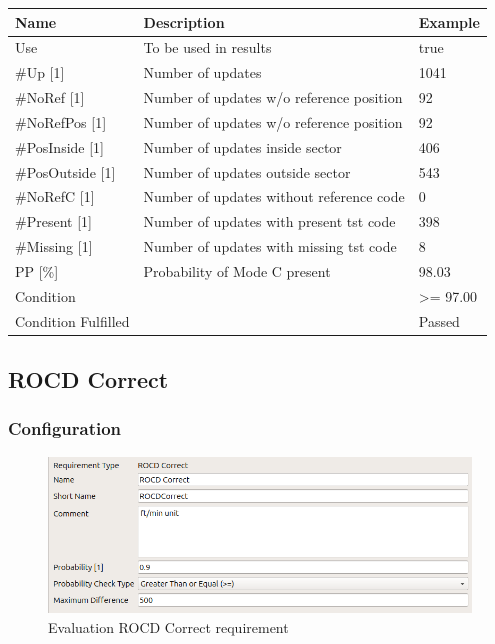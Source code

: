\begin{center}
 \begin{table}[H]
  \begin{tabularx}{\textwidth}{ | l | X |  l | }
    \hline
    \textbf{Name} & \textbf{Description} & \textbf{Example} \\ \hline
    Use & To be used in results & true \\ \hline
    \#Up [1] & Number of updates & 1041 \\ \hline
    \#NoRef [1] & Number of updates w/o reference position & 92 \\ \hline
    \#NoRefPos [1] & Number of updates w/o reference position  & 92 \\ \hline
    \#PosInside [1] & Number of updates inside sector & 406 \\ \hline
    \#PosOutside [1] & Number of updates outside sector & 543 \\ \hline
    \#NoRefC [1] & Number of updates without reference code & 0 \\ \hline
    \#Present [1] & Number of updates with present tst code & 398 \\ \hline
    \#Missing [1] & Number of updates with missing tst code & 8 \\ \hline
    PP [\%] & Probability of Mode C present & 98.03 \\ \hline
    Condition &  & >= 97.00 \\ \hline
    Condition Fulfilled &  & Passed \\ \hline
\end{tabularx}
\end{table}
\end{center}

\subsection{ROCD Correct}
\label{sec:eval_req_rocd_correct} 

\subsubsection{Configuration}

\begin{figure}[H]
    \includegraphics[width=14cm,frame]{figures/eval_req_rocd_correct.png}
  \caption{Evaluation ROCD Correct requirement}
\end{figure}

